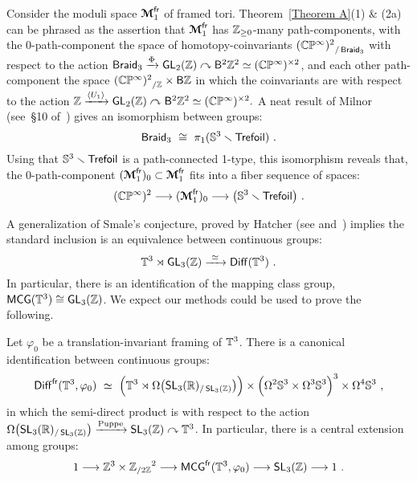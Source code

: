\begin{remark}
Consider the moduli space $\boldsymbol{\mathcal M}^{\operatorname{\sf fr}}_1$ of framed tori.  
Theorem~\ref{Theorem A}(1) \& (2a) can be phrased as the assertion that $\boldsymbol{\mathcal M}^{\operatorname{\sf fr}}_1$ has $\mathbb Z_{\geq 0}$-many path-components, with the $0$-path-component the space of homotopy-coinvariants ${(\mathbb C\mathbb P^\infty)^2}_{/ \operatorname{{\sf Braid}_3}}$ with respect to the action $\operatorname{{\sf Braid}_3} \xrightarrow{\Phi}\operatorname{\sf GL}_2(\mathbb Z) \curvearrowright \mathsf B^2 \mathbb Z^2 \simeq (\mathbb C\mathbb P^\infty)^{\times 2}$, and each other path-component the space ${(\mathbb C\mathbb P^\infty)^2}_{/\mathbb Z} \times \mathsf B \mathbb Z$ in which the coinvariants are with respect to the action $\mathbb Z \xrightarrow{\langle U_1\rangle }\operatorname{\sf GL}_2(\mathbb Z) \curvearrowright \mathsf B^2 \mathbb Z^2 \simeq (\mathbb C\mathbb P^\infty)^{\times 2}.$
A neat result of Milnor (see~\S10 of~\cite{mil}) gives an isomorphism between groups: 
\[
\operatorname{{\sf Braid}_3}
~\cong~ 
\pi_1 (\mathbb S^3 \smallsetminus {\sf Trefoil} )
~.
\]
Using that $\mathbb S^3 \smallsetminus {\sf Trefoil}$ is a path-connected 1-type, this isomorphism reveals that, the $0$-path-component $(\boldsymbol{\mathcal M}^{\operatorname{\sf fr}}_1)_{0} \subset \boldsymbol{\mathcal M}^{\operatorname{\sf fr}}_1$ fits into a fiber sequence of spaces:
\[
(\mathbb C\mathbb P^\infty)^2
\longrightarrow
(\boldsymbol{\mathcal M}^{\operatorname{\sf fr}}_1)_{0}
\longrightarrow
\bigl( \mathbb S^3 \smallsetminus {\sf Trefoil} \bigr)
~.
\]


\end{remark}





%



A generalization of Smale's conjecture, proved by Hatcher (see \cite{sm} and~\cite{hatcher}) implies the standard inclusion is an equivalence between continuous groups:
\[
\mathbb T^3 \rtimes \operatorname{\sf GL}_3(\mathbb Z)
\xrightarrow{~\simeq~}
\operatorname{{\sf Diff}}(\mathbb T^3)
~.
\]
In particular, there is an identification of the mapping class group,
$
{\sf MCG}(\mathbb T^3)
\cong
\operatorname{\sf GL}_3(\mathbb Z)
$.
We expect our methods could be used to prove the following.  
\begin{conj}
Let $\varphi_0$ be a translation-invariant framing of $\mathbb T^3$.
There is a canonical identification between continuous groups:
\[
\operatorname{{\sf Diff}}^{\operatorname{\sf fr}}(\mathbb T^3,\varphi_0)
~\simeq~
\Bigl(
\mathbb T^3
\rtimes 
\Omega \bigl( \operatorname{\sf SL}_3(\mathbb R)_{/\operatorname{\sf SL}_3(\mathbb Z)} \bigr)
\Bigr) 
\times
\Bigl(
\Omega^2 \mathbb S^3 \times \Omega^3 \mathbb S^3 
\Bigr)^3
\times
\Omega^4 \mathbb S^3
~,
\]
in which the semi-direct product is with respect to the action $\Omega \bigl( \operatorname{\sf SL}_3(\mathbb R)_{/\operatorname{\sf SL}_3(\mathbb Z)} \bigr) \xrightarrow{\rm Puppe} \operatorname{\sf SL}_3(\mathbb Z) \curvearrowright \mathbb T^3$.
In particular, there is a central extension among groups:
\[
1
\longrightarrow
\mathbb Z^3 \times {\mathbb Z_{/2\mathbb Z}}^2
\longrightarrow
{\sf MCG}^{\operatorname{\sf fr}}(\mathbb T^3,\varphi_0) 
\longrightarrow
\operatorname{\sf SL}_3(\mathbb Z)
\longrightarrow
1
~.
\]

\end{conj}





